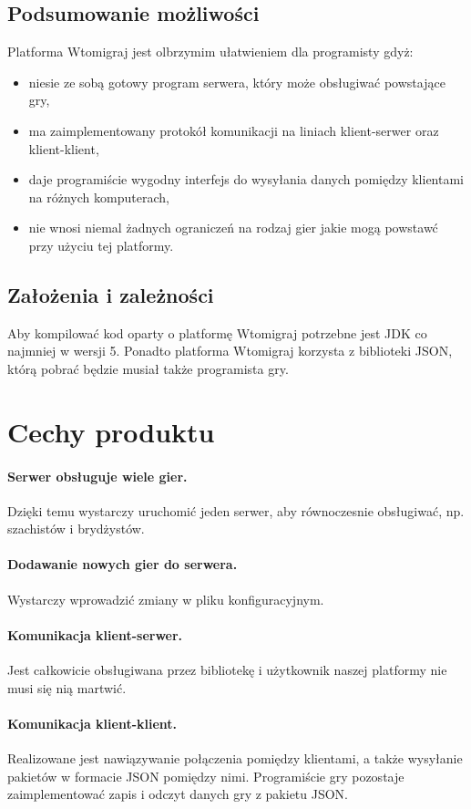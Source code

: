 \documentclass[a4paper, 12pt]{article}
\begin{document}
\subsection[Podsumowanie możliwości]{Podsumowanie możliwości}
Platforma Wtomigraj jest olbrzymim ułatwieniem dla programisty gdyż:
\begin{itemize}
 \item niesie ze sobą gotowy program serwera, który może obsługiwać powstające gry,
 \item ma zaimplementowany protokół komunikacji na liniach klient-serwer oraz klient-klient,
 \item daje programiście wygodny interfejs do wysyłania danych pomiędzy klientami na różnych komputerach,
 \item nie wnosi niemal żadnych ograniczeń na rodzaj gier jakie mogą powstawć przy użyciu tej platformy.
\end{itemize}

\subsection[Założenia i zależności]{Założenia i zależności}
Aby kompilować kod oparty o platformę Wtomigraj potrzebne jest JDK co najmniej w wersji 5. Ponadto platforma Wtomigraj korzysta z biblioteki JSON, którą pobrać będzie musiał także programista gry.

\section[Cechy produktu]{Cechy produktu}
\paragraph{Serwer obsługuje wiele gier.} Dzięki temu wystarczy uruchomić jeden serwer, aby równoczesnie obsługiwać, np. szachistów i brydżystów.
\paragraph{Dodawanie nowych gier do serwera.} Wystarczy wprowadzić zmiany w pliku konfiguracyjnym.
\paragraph{Komunikacja klient-serwer.} Jest całkowicie obsługiwana przez bibliotekę i użytkownik naszej platformy nie musi się nią martwić.
\paragraph{Komunikacja klient-klient.} Realizowane jest nawiązywanie połączenia pomiędzy klientami, a także wysyłanie pakietów w formacie JSON pomiędzy nimi. Programiście gry pozostaje zaimplementować zapis i odczyt danych gry z pakietu JSON.
\end{document}

